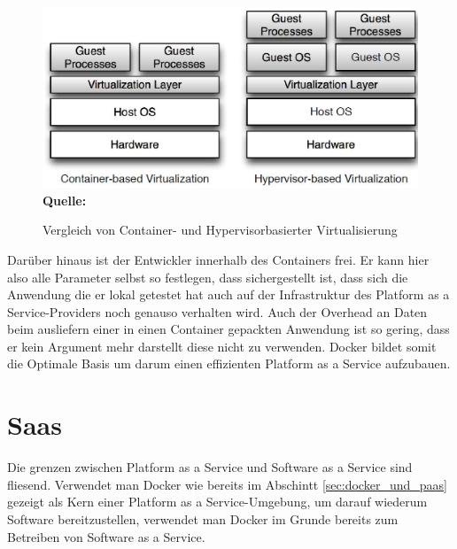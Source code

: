 \begin{figure}[htbp]
  \centering  
  \includegraphics[scale=0.5]{img/abstractionContainerHyper.JPG}\\
  \footnotesize\sffamily\textbf{Quelle:} \cite{miguel_g._xavier_performance_????}
  \caption{Vergleich von Container- und Hypervisorbasierter Virtualisierung }
  \label{fig:abstraction_container_hyper}
\end{figure}
 Darüber hinaus ist der Entwickler innerhalb des Containers frei. Er kann hier also alle Parameter selbst so festlegen, dass sichergestellt ist, dass sich die Anwendung die er lokal getestet hat auch auf der Infrastruktur des Platform as a Service-Providers noch genauso verhalten wird. Auch der Overhead an Daten beim ausliefern einer in einen Container gepackten Anwendung ist so gering, dass er kein Argument mehr darstellt diese nicht zu verwenden.
Docker bildet somit die Optimale Basis um darum einen effizienten Platform as a Service aufzubauen. 

\section{Saas}
\label{sec:saas}
Die grenzen zwischen Platform as a Service und Software as a Service sind fliesend.
Verwendet man Docker wie bereits im Abschintt \ref{sec:docker_und_paas} gezeigt als Kern einer Platform as a Service-Umgebung, um darauf wiederum Software bereitzustellen, verwendet man Docker im Grunde bereits zum Betreiben von Software as a Service.

